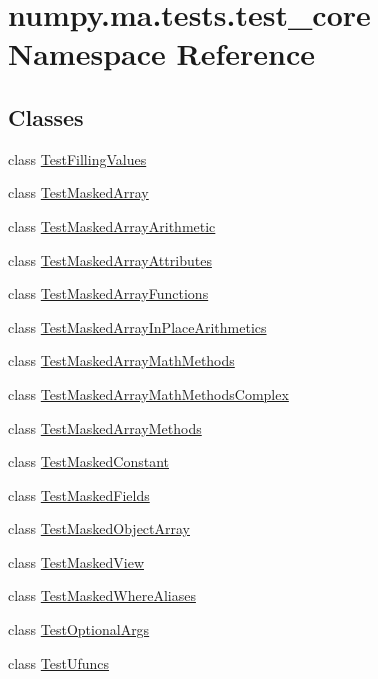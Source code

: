 \hypertarget{namespacenumpy_1_1ma_1_1tests_1_1test__core}{}\section{numpy.\+ma.\+tests.\+test\+\_\+core Namespace Reference}
\label{namespacenumpy_1_1ma_1_1tests_1_1test__core}
\subsection*{Classes}
\begin{DoxyCompactItemize}
\item 
class \hyperlink{classnumpy_1_1ma_1_1tests_1_1test__core_1_1TestFillingValues}{Test\+Filling\+Values}
\item 
class \hyperlink{classnumpy_1_1ma_1_1tests_1_1test__core_1_1TestMaskedArray}{Test\+Masked\+Array}
\item 
class \hyperlink{classnumpy_1_1ma_1_1tests_1_1test__core_1_1TestMaskedArrayArithmetic}{Test\+Masked\+Array\+Arithmetic}
\item 
class \hyperlink{classnumpy_1_1ma_1_1tests_1_1test__core_1_1TestMaskedArrayAttributes}{Test\+Masked\+Array\+Attributes}
\item 
class \hyperlink{classnumpy_1_1ma_1_1tests_1_1test__core_1_1TestMaskedArrayFunctions}{Test\+Masked\+Array\+Functions}
\item 
class \hyperlink{classnumpy_1_1ma_1_1tests_1_1test__core_1_1TestMaskedArrayInPlaceArithmetics}{Test\+Masked\+Array\+In\+Place\+Arithmetics}
\item 
class \hyperlink{classnumpy_1_1ma_1_1tests_1_1test__core_1_1TestMaskedArrayMathMethods}{Test\+Masked\+Array\+Math\+Methods}
\item 
class \hyperlink{classnumpy_1_1ma_1_1tests_1_1test__core_1_1TestMaskedArrayMathMethodsComplex}{Test\+Masked\+Array\+Math\+Methods\+Complex}
\item 
class \hyperlink{classnumpy_1_1ma_1_1tests_1_1test__core_1_1TestMaskedArrayMethods}{Test\+Masked\+Array\+Methods}
\item 
class \hyperlink{classnumpy_1_1ma_1_1tests_1_1test__core_1_1TestMaskedConstant}{Test\+Masked\+Constant}
\item 
class \hyperlink{classnumpy_1_1ma_1_1tests_1_1test__core_1_1TestMaskedFields}{Test\+Masked\+Fields}
\item 
class \hyperlink{classnumpy_1_1ma_1_1tests_1_1test__core_1_1TestMaskedObjectArray}{Test\+Masked\+Object\+Array}
\item 
class \hyperlink{classnumpy_1_1ma_1_1tests_1_1test__core_1_1TestMaskedView}{Test\+Masked\+View}
\item 
class \hyperlink{classnumpy_1_1ma_1_1tests_1_1test__core_1_1TestMaskedWhereAliases}{Test\+Masked\+Where\+Aliases}
\item 
class \hyperlink{classnumpy_1_1ma_1_1tests_1_1test__core_1_1TestOptionalArgs}{Test\+Optional\+Args}
\item 
class \hyperlink{classnumpy_1_1ma_1_1tests_1_1test__core_1_1TestUfuncs}{Test\+Ufuncs}
\end{DoxyCompactItemize}
